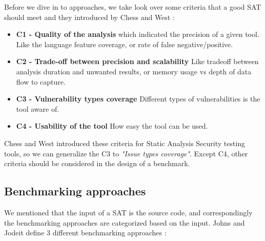 \documentclass[authoryear,preprint]{sigplanconf}
\begin{document}
Before we dive in to approaches, we take look over some criteria that a good SAT should meet and they introduced by Chess and West \cite{Chess:2007:SPS:1406221}:

\begin{itemize}
	\item \textbf{C1 - Quality of the analysis} which indicated the precision of a given tool. Like the language feature coverage, or rate of false negative/positive.
	\item \textbf{C2 - Trade-off between precision and scalability} Like tradeoff between analysis duration and unwanted results, or memory usage vs depth of data flow to capture. 
	\item \textbf{C3 - Vulnerability types coverage} Different types of vulnerabilities is the tool aware of. 
	\item \textbf{C4 - Usability of the tool} How easy the tool can be used.
\end{itemize}

Chess and West introduced these criteria for Static Analysis Security testing tools, so we can generalize the C3 to \textit{"Issue types coverage"}. Except C4, other criteria should be considered in the design of a benchmark. 

\subsection{Benchmarking approaches}
We mentioned that the input of a SAT is the source code, and correspondingly the benchmarking approaches are categorized based on the input. Johns and Jodeit define 3 different benchmarking approaches \cite{Scanstud}: 
\end{document}
